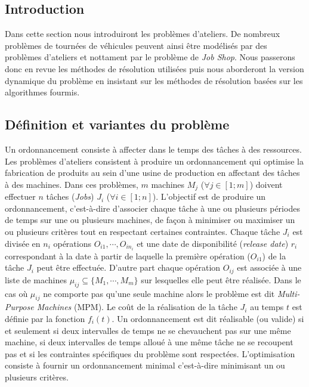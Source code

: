 \label{sec:jssp}

\subsection*{Introduction}
Dans cette section nous introduiront les problèmes d'ateliers. De nombreux problèmes de tournées de véhicules peuvent ainsi être modélisés par des problèmes d'ateliers et nottament par le problème de \textit{Job Shop}. Nous passerons donc en revue les méthodes de résolution utilisées puis nous aborderont la version dynamique du problème en insistant sur les méthodes de résolution basées sur les algorithmes fourmis.

\subsection{Définition et variantes du problème}
Un ordonnancement consiste à affecter dans le temps des tâches à des ressources. Les problèmes d'ateliers consistent à produire un ordonnancement qui optimise la fabrication de produits au sein d'une usine de production en affectant des tâches à des machines.
Dans ces problèmes, $m$ machines $M_j$ ($\forall j \in [1;m]$) doivent effectuer $n$ tâches (\textit{Jobs}) $J_i$ ($\forall i \in [1;n]$). L'objectif est de produire un ordonnancement, c'est-à-dire d'associer chaque tâche à une ou plusieurs périodes de temps sur une ou plusieurs machines, de façon à minimiser ou maximiser un ou plusieurs critères tout en respectant certaines contraintes.
Chaque tâche $J_i$ est divisée en $n_i$ opérations $O_{i1}, \cdots, O_{in_i}$ et une date de disponibilité (\textit{release date}) $r_i$ correspondant à la date à partir de laquelle la première opération ($O_{i1}$) de la tâche $J_i$ peut être effectuée. D'autre part chaque opération $O_{ij}$ est associée à une liste de machines $\mu_{ij} \subseteq \{M_1,\cdots,M_m\}$ sur lesquelles elle peut être réalisée. Dans le cas où $\mu_{ij}$ ne comporte pas qu'une seule machine alors le problème est dit \textit{Multi-Purpose Machines} (MPM).
Le coût de la réalisation de la tâche $J_i$ au temps $t$ est définie par la fonction $f_i(t)$.
Un ordonnancement est dit réalisable (ou valide) si et seulement si deux intervalles de temps ne se chevauchent pas sur une même machine, si deux intervalles de temps alloué à une même tâche ne se recoupent pas et si les contraintes spécifiques du problème sont respectées.
L'optimisation consiste à fournir un ordonnancement minimal c'est-à-dire minimisant un ou plusieurs critères.

